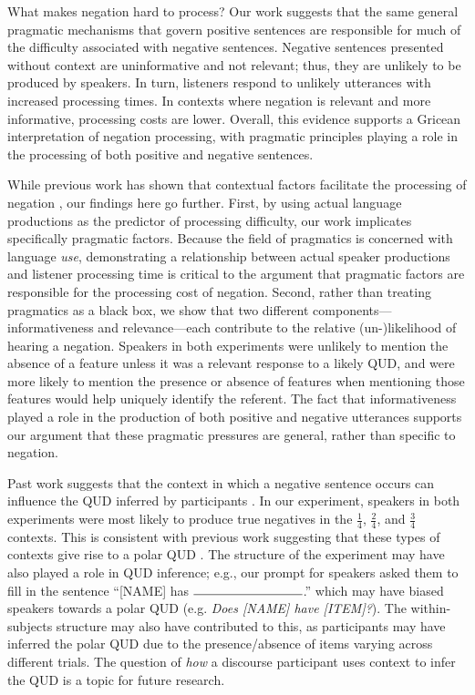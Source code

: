 \documentclass[man, floatsintext, noapacite]{apa6}
\begin{document}
What makes negation hard to process? Our work suggests that the same general pragmatic mechanisms that govern positive sentences are responsible for much of the difficulty associated with negative sentences. Negative sentences presented without context are uninformative and not relevant; thus, they are unlikely to be produced by speakers. In turn, listeners respond to unlikely utterances with increased processing times. In contexts where negation is relevant and more informative, processing costs are lower. Overall, this evidence supports a Gricean interpretation of negation processing, with pragmatic principles playing a role in the processing of both positive and negative sentences.

While previous work has shown that contextual factors facilitate the processing of negation \cite{wason1965,nieuwland2008,dale2011,orenes2014}, our findings here go further. First, by using actual language productions as the predictor of processing difficulty, our work implicates specifically pragmatic factors. Because the field of pragmatics is concerned with language \textit{use}, demonstrating a relationship between actual speaker productions and listener processing time is critical to the argument that pragmatic factors are responsible for the processing cost of negation. Second, rather than treating pragmatics as a black box, we show that two different components---informativeness and relevance---each contribute to the relative (un-)likelihood of hearing a negation. Speakers in both experiments were unlikely to mention the absence of a feature unless it was a relevant response to a likely QUD, and were more likely to mention the presence or absence of features when mentioning those features would help uniquely identify the referent. The fact that informativeness played a role in the production of both positive and negative utterances supports our argument that these pragmatic pressures are general, rather than specific to negation. 

Past work suggests that the context in which a negative sentence occurs can influence the QUD inferred by participants \cite{tian2010, xiang2020}. In our experiment, speakers in both experiments were most likely to produce true negatives in the $\frac{1}{4}$, $\frac{2}{4}$, and $\frac{3}{4}$ contexts. This is consistent with previous work suggesting that these types of contexts give rise to a polar QUD \cite{xiang2020}. The structure of the experiment may have also played a role in QUD inference; e.g., our prompt for speakers asked them to fill in the sentence ``[NAME] has $\rule{3cm}{0.15mm}$.'' which may have biased speakers towards a polar QUD (e.g. \textit{Does [NAME] have [ITEM]?}). The within-subjects structure may also have contributed to this, as participants may have inferred the polar QUD due to the presence/absence of items varying across different trials. The question of \textit{how} a discourse participant uses context to infer the QUD is a topic for future research. 
\end{document}
